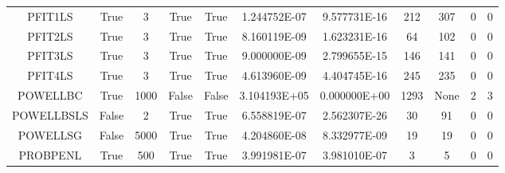 \begin{longtable}{ccccccccccc}
	\cellcolor{default2} PFIT1LS& \cellcolor{default2} True& \cellcolor{default2} 3& \cellcolor{default2} True& \cellcolor{default2} True& \cellcolor{ok} 1.244752E-07& \cellcolor{best} 9.577731E-16& \cellcolor{best} 212& \cellcolor{ok} 307& \cellcolor{default2} 0& \cellcolor{default2} 0\\
	\cellcolor{default1} PFIT2LS& \cellcolor{default1} True& \cellcolor{default1} 3& \cellcolor{default1} True& \cellcolor{default1} True& \cellcolor{ok} 8.160119E-09& \cellcolor{best} 1.623231E-16& \cellcolor{best} 64& \cellcolor{ok} 102& \cellcolor{default1} 0& \cellcolor{default1} 0\\
	\cellcolor{default2} PFIT3LS& \cellcolor{default2} True& \cellcolor{default2} 3& \cellcolor{default2} True& \cellcolor{default2} True& \cellcolor{ok} 9.000000E-09& \cellcolor{best} 2.799655E-15& \cellcolor{ok} 146& \cellcolor{best} 141& \cellcolor{default2} 0& \cellcolor{default2} 0\\
	\cellcolor{default1} PFIT4LS& \cellcolor{default1} True& \cellcolor{default1} 3& \cellcolor{default1} True& \cellcolor{default1} True& \cellcolor{ok} 4.613960E-09& \cellcolor{best} 4.404745E-16& \cellcolor{ok} 245& \cellcolor{best} 235& \cellcolor{default1} 0& \cellcolor{default1} 0\\
	\cellcolor{default2} POWELLBC& \cellcolor{default2} True& \cellcolor{default2} 1000& \cellcolor{default2} False& \cellcolor{default2} False& \cellcolor{poor} 3.104193E+05& \cellcolor{best} 0.000000E+00& \cellcolor{best} 1293& \cellcolor{err} None& \cellcolor{default2} 2& \cellcolor{default2} 3\\
	\cellcolor{default1} POWELLBSLS& \cellcolor{default1} False& \cellcolor{default1} 2& \cellcolor{default1} True& \cellcolor{default1} True& \cellcolor{ok} 6.558819E-07& \cellcolor{best} 2.562307E-26& \cellcolor{best} 30& \cellcolor{poor} 91& \cellcolor{default1} 0& \cellcolor{default1} 0\\
	\cellcolor{default2} POWELLSG& \cellcolor{default2} False& \cellcolor{default2} 5000& \cellcolor{default2} True& \cellcolor{default2} True& \cellcolor{ok} 4.204860E-08& \cellcolor{best} 8.332977E-09& \cellcolor{best} 19& \cellcolor{best} 19& \cellcolor{default2} 0& \cellcolor{default2} 0\\
	\cellcolor{default1} PROBPENL& \cellcolor{default1} True& \cellcolor{default1} 500& \cellcolor{default1} True& \cellcolor{default1} True& \cellcolor{ok} 3.991981E-07& \cellcolor{best} 3.981010E-07& \cellcolor{best} 3& \cellcolor{ok} 5& \cellcolor{default1} 0& \cellcolor{default1} 0\\

\end{longtable}
